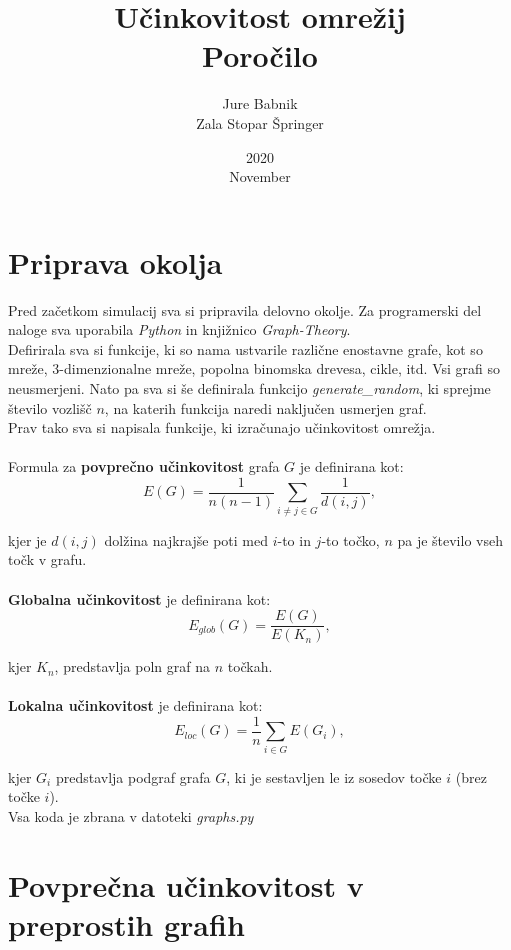\documentclass[a4paper, 16pt]{article}
\title{%
    Učinkovitost omrežij \\ 
    \large Poročilo}
\date{2020\\ November}
\author{Jure Babnik \\  Zala Stopar Špringer}
\begin{document}
\maketitle
{}


\newpage

\tableofcontents

\newpage
{}

\section{Priprava okolja}

Pred začetkom simulacij sva si pripravila delovno okolje. Za programerski del naloge sva uporabila \emph{Python}
in knjižnico \emph{Graph-Theory}.\\ 
Defirirala sva si funkcije, ki so nama ustvarile različne enostavne grafe, kot so mreže, 3-dimenzionalne mreže, 
popolna binomska drevesa, cikle, itd. Vsi grafi so neusmerjeni. Nato pa sva si še definirala funkcijo \emph{generate\_random}, 
ki sprejme število vozlišč $n$, na katerih funkcija naredi naključen usmerjen graf.\\
Prav tako sva si napisala funkcije, ki izračunajo učinkovitost omrežja. \\
\\
Formula za \textbf{povprečno učinkovitost} grafa $G$ je definirana kot:
$$ E(G) = \frac{1}{n(n-1)} \sum_{i\neq j \in G} \frac{1}{d(i,j)},$$

kjer je $d(i,j)$ dolžina najkrajše poti med $i$-to in $j$-to točko, $n$ pa je število vseh točk v grafu.\\
\\
\textbf{Globalna učinkovitost} je definirana kot:
$$ E_{glob}(G) = \frac{E(G)}{E(K_n)}, $$

kjer $K_n$, predstavlja poln graf na $n$ točkah.\\
\\
\textbf{Lokalna učinkovitost} je definirana kot:
$$ E_{loc}(G) = \frac{1}{n} \sum_{i \in G} E(G_i), $$

kjer $G_i$ predstavlja podgraf grafa $G$, ki je sestavljen le iz sosedov točke $i$ (brez točke $i$). \\

Vsa koda je zbrana v datoteki \emph{graphs.py}

\newpage

\section{Povprečna učinkovitost v preprostih grafih}
\end{document}
